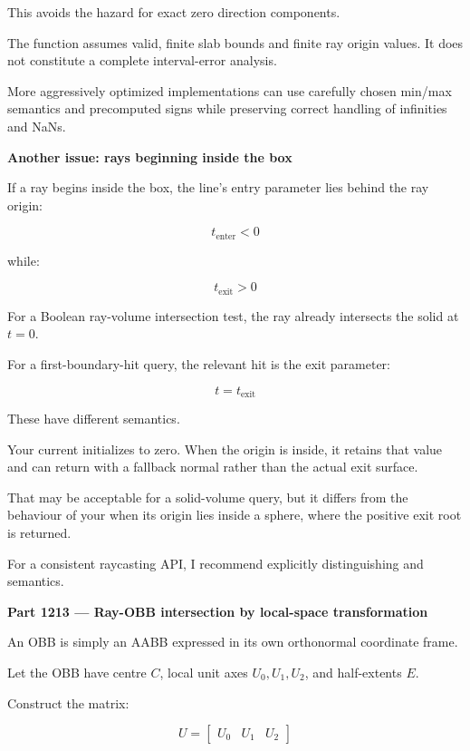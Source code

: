 This avoids the  hazard for exact zero direction components.

The function assumes valid, finite slab bounds and finite ray origin values. It does not constitute a complete interval-error analysis.

More aggressively optimized implementations can use carefully chosen min/max semantics and precomputed signs while preserving correct handling of infinities and NaNs.

\textbf{Another issue: rays beginning inside the box}

If a ray begins inside the box, the line's entry parameter lies behind the ray origin:

\[
t_{\mathrm{enter}}<0
\]

while:

\[
t_{\mathrm{exit}}>0
\]

For a Boolean ray-volume intersection test, the ray already intersects the solid at \(t=0\).

For a first-boundary-hit query, the relevant hit is the exit parameter:

\[
\boxed{t=t_{\mathrm{exit}}}
\]

These have different semantics.

Your current  initializes  to zero. When the origin is inside, it retains that value and can return  with a fallback normal rather than the actual exit surface.

That may be acceptable for a solid-volume query, but it differs from the behaviour of your  when its origin lies inside a sphere, where the positive exit root is returned.

For a consistent raycasting API, I recommend explicitly distinguishing  and  semantics.

\textbf{Part 1213 --- Ray-OBB intersection by local-space transformation}

An OBB is simply an AABB expressed in its own orthonormal coordinate frame.

Let the OBB have centre \(C\), local unit axes \(U_0,U_1,U_2\), and half-extents \(E\).

Construct the matrix:

\[
U= \begin{bmatrix} U_0&U_1&U_2 \end{bmatrix}
\]

